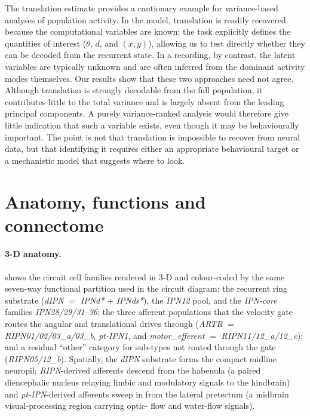 \documentclass[11pt]{article}
\begin{document}
The translation estimate provides a cautionary example for variance-based
analyses of population activity. In the model, translation is readily recovered
because the computational variables are known: the task explicitly defines the
quantities of interest ($\theta$, $d$, and $(x,y)$), allowing us to test
directly whether they can be decoded from the recurrent state. In a recording,
by contrast, the latent variables are typically unknown and are often inferred
from the dominant activity modes themselves. Our results show that these two
approaches need not agree. Although translation is strongly decodable from the
full population, it contributes little to the total variance and is largely
absent from the leading principal components. A purely variance-ranked analysis
would therefore give little indication that such a variable exists, even though
it may be behaviourally important. The point is not that translation is
impossible to recover from neural data, but that identifying it requires either
an appropriate behavioural target or a mechanistic model that suggests where to
look.

\section{Anatomy, functions and connectome}
\label{sec:anatomy}

\paragraph{3-D anatomy.}
 shows the circuit cell families rendered in
3-D and colour-coded by the same seven-way functional partition used
in the circuit diagram: the recurrent ring substrate
(\emph{dIPN} $=$ \emph{IPNd*} $+$ \emph{IPNds*}), the \emph{IPN12}
pool, and the \emph{IPN-core} families \emph{IPN28/29/31--36}; the
three afferent populations that
the velocity gate routes the angular and translational drives through
(\emph{ARTR} $=$ \emph{RIPN01/02/03\_a/03\_b}, \emph{pt-IPN1}, and
\emph{motor\_efferent} $=$ \emph{RIPN11/12\_a/12\_c}); and a residual
``other'' category for sub-types not routed through the gate
(\emph{RIPN05/12\_b}). Spatially, the
\emph{dIPN} substrate forms the compact midline neuropil;
\emph{RIPN}-derived afferents descend from the habenula (a paired
diencephalic nucleus relaying limbic and modulatory signals to the
hindbrain) and \emph{pt-IPN}-derived afferents sweep in from the
lateral pretectum (a midbrain visual-processing region carrying optic-
flow and water-flow signals).
\end{document}
